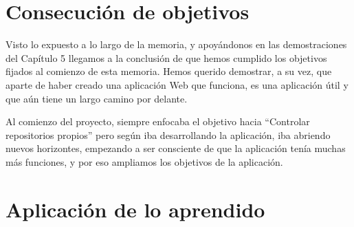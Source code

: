 \documentclass[a4paper, 12pt]{book}
\begin{document}
\section{Consecución de objetivos}
\label{sec:consecucion-objetivos}

Visto lo expuesto a lo largo de la memoria, y apoyándonos en las demostraciones del Capítulo 5 llegamos a la conclusión de que hemos cumplido los objetivos fijados al comienzo de esta memoria.
Hemos querido demostrar, a su vez, que aparte de haber creado una aplicación Web que funciona, es una aplicación útil y que aún tiene un largo camino por delante.

Al comienzo del proyecto, siempre enfocaba el objetivo hacia ``Controlar repositorios propios'' pero según iba desarrollando la aplicación, iba abriendo nuevos horizontes, empezando a ser consciente de que la aplicación tenía muchas más funciones, y por eso ampliamos los objetivos de la aplicación.

\section{Aplicación de lo aprendido}
\label{sec:aplicacion}
\end{document}
